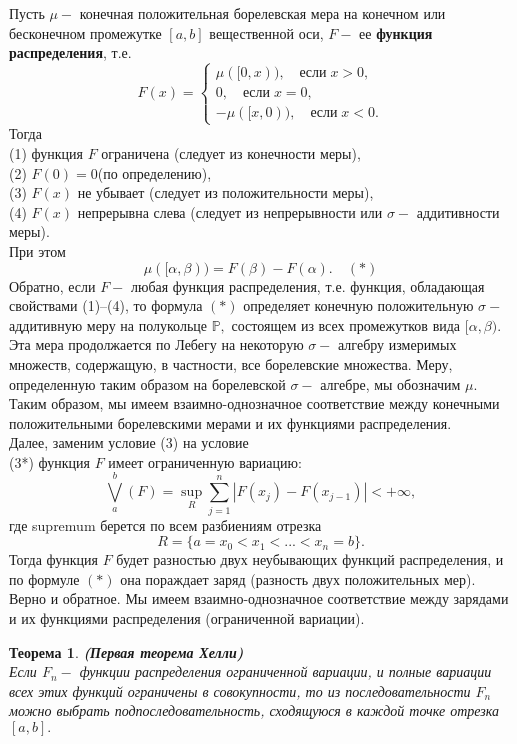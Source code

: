 \documentclass[12 pt, a4 paper]{article}
\theoremstyle{plain}   \newtheorem{Pro}{Задача}
\newtheorem{The}{Теорема}
\begin{document}
Пусть
$ \mu - $
конечная положительная борелевская мера на конечном или бесконечном
промежутке
$ [a,b] $
вещественной оси,
$ F - $
ее
{\bfseries функция распределения},
т.е.
\begin{equation*}
  F(x)=
    \begin{cases}
	  \mu ([0,x)), \quad если \; x>0,\\
	  0, \quad если \; x=0,\\
	  -\mu ([x,0)), \quad если \; x<0.
	\end{cases}
\end{equation*}
Тогда
\\
(1) функция
$ F $
ограничена (следует из конечности меры),\\
(2) $ F(0)=0 $(по определению),\\
(3) $ F(x) $ не убывает (следует из положительности меры),\\
(4) $ F(x) $ непрерывна слева (следует из непрерывности или
$ \sigma- $ аддитивности меры).\\
При этом
$$
  \mu ([\alpha , \beta ))=F(\beta )-F(\alpha ).
  \quad (\ast )
$$
Обратно, если
$ F - $
любая функция распределения, т.е. функция, обладающая свойствами
(1)--(4), то формула
$ (\ast ) $
определяет конечную положительную
$ \sigma - $
аддитивную меру на полукольце
$ \mathbb{P} , $
состоящем из всех промежутков вида
$ [\alpha , \beta ) . $
Эта мера продолжается по Лебегу на некоторую
$ \sigma- $
алгебру измеримых множеств, содержащую, в частности, все
борелевские множества. Меру, определенную таким образом на
борелевской
$ \sigma- $
алгебре, мы обозначим
$ \mu . $
Таким образом, мы имеем взаимно-однозначное соответствие
между конечными положительными борелевскими мерами и их
функциями распределения.\\
Далее, заменим условие (3) на условие
\\
(3*) функция
$ F $
имеет ограниченную вариацию:
$$
  \bigvee _a ^b (F)=\sup _R \sum _{j=1}^n
  |F(x_j )-F(x_{j-1})|< + \infty ,
$$
где supremum берется по всем разбиениям отрезка
$$
  R=\{ a=x_0 <x_1 <...<x_n =b \} .
$$
Тогда функция
$ F $
будет разностью двух неубывающих функций распределения, и
по формуле
$ (\ast ) $
она пораждает заряд (разность двух положительных мер).
Верно и обратное. Мы имеем взаимно-однозначное соответствие между
зарядами и их функциями распределения (ограниченной вариации).
\begin{The}
{\bfseries (Первая теорема Хелли)}\\
Если
$ F_n - $
функции распределения ограниченной вариации, и полные вариации
всех этих функций ограничены в совокупности, то из последовательности
$ F_n $
можно выбрать подпоследовательность, сходящуюся в каждой точке отрезка
$ [a,b]. $
\end{The}
\end{document}
